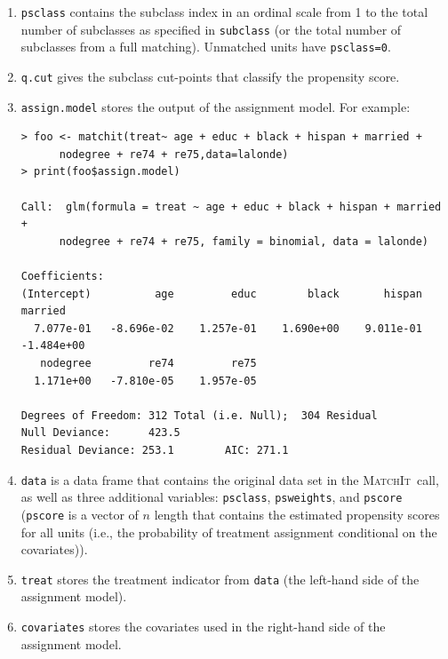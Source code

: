 \documentclass[oneside,letterpaper,titlepage]{article}
\newcommand{\MatchIt}{\textsc{MatchIt}}
\begin{document}
\begin{enumerate}
 \item \texttt{psclass} contains the subclass index in an ordinal
   scale from 1 to the total number of subclasses as specified in
   \texttt{subclass} (or the total number of subclasses from a full
   matching).  Unmatched units have \texttt{psclass=0}.
   
 \item \texttt{q.cut} gives the subclass cut-points that classify the
 propensity score.
   
 \item \texttt{assign.model} stores the output of the assignment
   model.  For example:
  
  \begin{footnotesize}
\begin{verbatim}
> foo <- matchit(treat~ age + educ + black + hispan + married +
      nodegree + re74 + re75,data=lalonde)
> print(foo$assign.model)

Call:  glm(formula = treat ~ age + educ + black + hispan + married +
      nodegree + re74 + re75, family = binomial, data = lalonde) 

Coefficients:
(Intercept)          age         educ        black       hispan      married  
  7.077e-01   -8.696e-02    1.257e-01    1.690e+00    9.011e-01   -1.484e+00  
   nodegree         re74         re75  
  1.171e+00   -7.810e-05    1.957e-05  

Degrees of Freedom: 312 Total (i.e. Null);  304 Residual
Null Deviance:      423.5 
Residual Deviance: 253.1        AIC: 271.1 
\end{verbatim} %
\end{footnotesize}

\item \texttt{data} is a data frame that contains the original data
  set in the \MatchIt\ call, as well as three additional variables:
  \texttt{psclass}, \texttt{psweights}, and \texttt{pscore}
  (\texttt{pscore} is a vector of $n$ length that contains the
  estimated propensity scores for all units (i.e., the probability of
  treatment assignment conditional on the covariates)).
  
\item \texttt{treat} stores the treatment indicator from \texttt{data}
  (the left-hand side of the assignment model).
  
\item \texttt{covariates} stores the covariates used in the right-hand
  side of the assignment model.
\end{enumerate}
\end{document}
